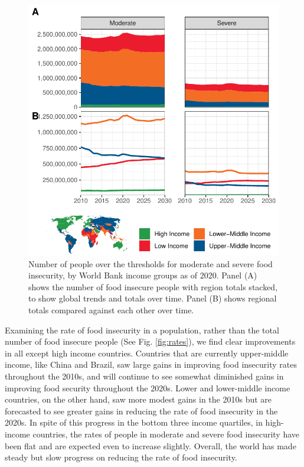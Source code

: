 \documentclass[titlepage]{article}
\begin{document}
\begin{figure}[H]
  \centering
  \includegraphics[width=\linewidth]{img/TimeSeries.pdf}
  \caption{Number of people over the thresholds for moderate and severe food insecurity, by World Bank income groups as of 2020.  Panel (A) shows the number of food insecure people with region totals stacked, to show global trends and totals over time.  Panel (B) shows regional totals compared against each other over time.}
  \label{fig:timeseries}
\end{figure}

Examining the rate of food insecurity in a population, rather than the total number of food insecure people (See Fig. \ref{fig:rates}), we find clear improvements in all except high income countries.  Countries that are currently upper-middle income, like China and Brazil, saw large gains in improving food insecurity rates throughout the 2010s, and will continue to see somewhat diminished gains in improving food security throughout the 2020s.  Lower and lower-middle income countries, on the other hand, saw more modest gains in the 2010s but are forecasted to see greater gains in reducing the rate of food insecurity in the 2020s.  In spite of this progress in the bottom three income quartiles, in high-income countries, the rates of people in moderate and severe food insecurity have been flat and are expected even to increase slightly.  Overall, the world has made steady but slow progress on reducing the rate of food insecurity.
\end{document}
